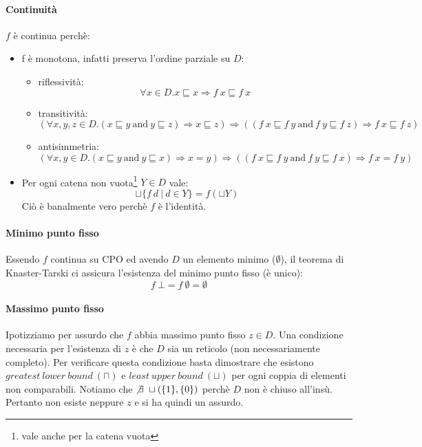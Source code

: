 \paragraph{Continuità} $f$ è continua perchè: 
\begin{itemize}
  \item f è monotona, infatti preserva l'ordine parziale su $D$:
  \begin{itemize}
    \item riflessività:
    $$
      \forall x \in D.x \sqsubseteq x \Rightarrow f\ x \sqsubseteq f\ x
    $$
    \item transitività:
    $$
      (\forall x,y,z \in D.(x \sqsubseteq y\ \text{and}\ y \sqsubseteq z) \Rightarrow
      x \sqsubseteq z)
      \Rightarrow 
      ((f\ x \sqsubseteq f\ y\ \text{and}\ f\ y \sqsubseteq f\ z) \Rightarrow
      f\ x \sqsubseteq f\ z)
    $$
    \item antisimmetria:
     $$
      (\forall x,y \in D.(x \sqsubseteq y\ \text{and}\ y \sqsubseteq x) \Rightarrow
      x = y)
      \Rightarrow 
      ((f\ x \sqsubseteq f\ y\ \text{and}\ f\ y \sqsubseteq f\ x) \Rightarrow
      f\ x = f\ y)
    $$
  \end{itemize}
  \item Per ogni catena non vuota\footnote{vale anche per la catena vuota} $Y \in D$ vale:
    $$ 
      \sqcup\{f\ d\ |\ d \in Y\} = f(\sqcup Y)
    $$
    Ciò è banalmente vero perchè $f$ è l'identità.
\end{itemize}
\paragraph{Minimo punto fisso}
Essendo $f$ continua su CPO  ed avendo $D$ un elemento minimo ($\emptyset$), il teorema di Knaster-Tarski ci 
assicura l'esistenza del minimo punto fisso (è unico):  
$$
f\ \bot = f\ \emptyset = \emptyset
$$

\paragraph{Massimo punto fisso}
Ipotizziamo per assurdo che $f$ abbia massimo punto fisso $z \in D$.
Una condizione necessaria per l'esistenza di $z$ è che $D$ sia un reticolo 
(non necessariamente completo). Per verificare questa condizione basta 
dimostrare che esistono $greatest\ lower\ bound\ (\sqcap)$ e 
$least\ upper\ bound\ (\sqcup)$ per ogni coppia di elementi non comparabili.
Notiamo che $\not \exists\ \sqcup(\{1\},\{0\})$ perchè $D$ non è chiuso all'insù. 
Pertanto non esiste neppure $z$ e si ha quindi un assurdo.

